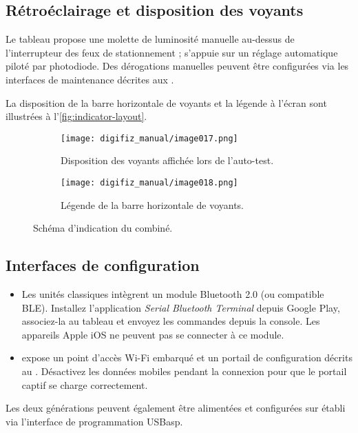 \subsection{Rétroéclairage et disposition des voyants}
Le tableau \ReplicaGenOneShort{} propose une molette de luminosité manuelle au-dessus de l'interrupteur des feux de stationnement ; \ReplicaNextShort{} s'appuie sur un réglage automatique piloté par photodiode. Des dérogations manuelles peuvent être configurées via les interfaces de maintenance décrites aux .

La disposition de la barre horizontale de voyants et la légende à l'écran sont illustrées à l'\autoref{fig:indicator-layout}.

\begin{figure}[htbp]
    \centering
    \begin{subfigure}{0.48\textwidth}
        \texttt{[image: digifiz\_manual/image017.png]}
        \caption{Disposition des voyants affichée lors de l'auto-test.}
    \end{subfigure}\hfill
    \begin{subfigure}{0.48\textwidth}
        \texttt{[image: digifiz\_manual/image018.png]}
        \caption{Légende de la barre horizontale de voyants.}
    \end{subfigure}
    \caption{Schéma d'indication du combiné.}
    \label{fig:indicator-layout}
\end{figure}

\subsection{Interfaces de configuration}
\begin{itemize}
    \item Les unités \ReplicaGenOne{} classiques intègrent un module Bluetooth 2.0 (ou compatible BLE). Installez l'application \emph{Serial Bluetooth Terminal} depuis Google Play, associez-la au tableau et envoyez les commandes depuis la console. Les appareils Apple iOS ne peuvent pas se connecter à ce module.
    \item \ReplicaNextShort{} expose un point d'accès Wi-Fi embarqué et un portail de configuration décrits au . Désactivez les données mobiles pendant la connexion pour que le portail captif se charge correctement.
\end{itemize}
Les deux générations peuvent également être alimentées et configurées sur établi via l'interface de programmation USBasp.
